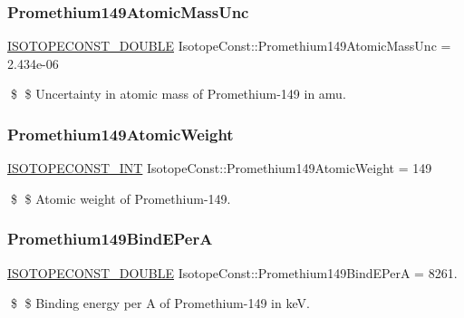 \subsubsection{\texorpdfstring{Promethium149\+Atomic\+Mass\+Unc}{Promethium149AtomicMassUnc}}
{\footnotesize\ttfamily \mbox{\hyperlink{group___isotope_const-_macros_ga8f45a7272ce02c0b4c65c44636ed719a}{I\+S\+O\+T\+O\+P\+E\+C\+O\+N\+S\+T\+\_\+\+D\+O\+U\+B\+LE}} Isotope\+Const\+::\+Promethium149\+Atomic\+Mass\+Unc = 2.\+434e-\/06}

\$ \$ Uncertainty in atomic mass of Promethium-\/149 in amu. \mbox{\label{group___isotope_const-_promethium-_pm149_gab557e54f8735b26b2eb812f526bcaa77}} 
\subsubsection{\texorpdfstring{Promethium149\+Atomic\+Weight}{Promethium149AtomicWeight}}
{\footnotesize\ttfamily \mbox{\hyperlink{group___isotope_const-_macros_ga5f18360b3e99483a35c32d789e62621c}{I\+S\+O\+T\+O\+P\+E\+C\+O\+N\+S\+T\+\_\+\+I\+NT}} Isotope\+Const\+::\+Promethium149\+Atomic\+Weight = 149}

\$ \$ Atomic weight of Promethium-\/149. \mbox{\label{group___isotope_const-_promethium-_pm149_ga1491193eecc74cee21401e0e8c83ba5a}} 
\subsubsection{\texorpdfstring{Promethium149\+Bind\+E\+PerA}{Promethium149BindEPerA}}
{\footnotesize\ttfamily \mbox{\hyperlink{group___isotope_const-_macros_ga8f45a7272ce02c0b4c65c44636ed719a}{I\+S\+O\+T\+O\+P\+E\+C\+O\+N\+S\+T\+\_\+\+D\+O\+U\+B\+LE}} Isotope\+Const\+::\+Promethium149\+Bind\+E\+PerA = 8261.}

\$ \$ Binding energy per A of Promethium-\/149 in keV. \mbox{\label{group___isotope_const-_promethium-_pm149_ga9f4f084dccdd65481fa97ea716a1ac55}} 
